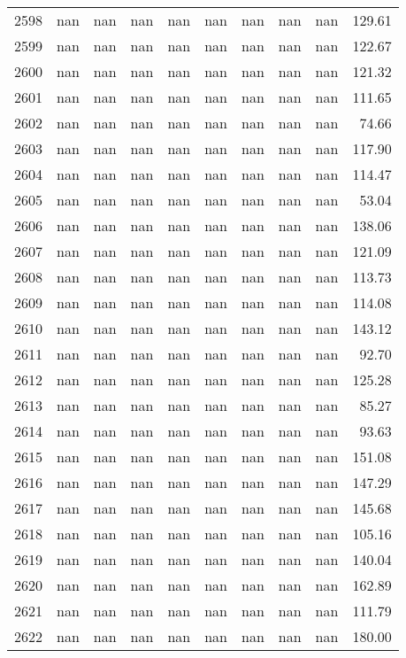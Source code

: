 \begin{tabular}{lrrrrrrrrr}
2598 & nan & nan & nan & nan & nan & nan & nan & nan & 129.61 \\
2599 & nan & nan & nan & nan & nan & nan & nan & nan & 122.67 \\
2600 & nan & nan & nan & nan & nan & nan & nan & nan & 121.32 \\
2601 & nan & nan & nan & nan & nan & nan & nan & nan & 111.65 \\
2602 & nan & nan & nan & nan & nan & nan & nan & nan & 74.66 \\
2603 & nan & nan & nan & nan & nan & nan & nan & nan & 117.90 \\
2604 & nan & nan & nan & nan & nan & nan & nan & nan & 114.47 \\
2605 & nan & nan & nan & nan & nan & nan & nan & nan & 53.04 \\
2606 & nan & nan & nan & nan & nan & nan & nan & nan & 138.06 \\
2607 & nan & nan & nan & nan & nan & nan & nan & nan & 121.09 \\
2608 & nan & nan & nan & nan & nan & nan & nan & nan & 113.73 \\
2609 & nan & nan & nan & nan & nan & nan & nan & nan & 114.08 \\
2610 & nan & nan & nan & nan & nan & nan & nan & nan & 143.12 \\
2611 & nan & nan & nan & nan & nan & nan & nan & nan & 92.70 \\
2612 & nan & nan & nan & nan & nan & nan & nan & nan & 125.28 \\
2613 & nan & nan & nan & nan & nan & nan & nan & nan & 85.27 \\
2614 & nan & nan & nan & nan & nan & nan & nan & nan & 93.63 \\
2615 & nan & nan & nan & nan & nan & nan & nan & nan & 151.08 \\
2616 & nan & nan & nan & nan & nan & nan & nan & nan & 147.29 \\
2617 & nan & nan & nan & nan & nan & nan & nan & nan & 145.68 \\
2618 & nan & nan & nan & nan & nan & nan & nan & nan & 105.16 \\
2619 & nan & nan & nan & nan & nan & nan & nan & nan & 140.04 \\
2620 & nan & nan & nan & nan & nan & nan & nan & nan & 162.89 \\
2621 & nan & nan & nan & nan & nan & nan & nan & nan & 111.79 \\
2622 & nan & nan & nan & nan & nan & nan & nan & nan & 180.00 \\

\end{tabular}
